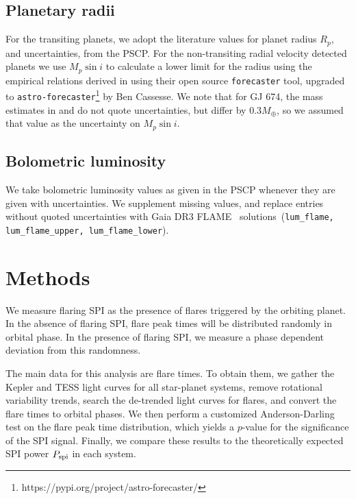 \documentclass[twocolumn]{aastex631}
\begin{document}
\subsection{Planetary radii}
\label{sec:data:planetradii}
For the transiting planets, we adopt the literature values for planet radius $R_p$, and uncertainties, from the PSCP. For the non-transiting radial velocity detected planets we use  $M_p\sin i$ to calculate a lower limit for the radius using the empirical relations derived in \cite{chen2017probabilistic} using their open source \texttt{forecaster} tool, upgraded to \texttt{astro-forecaster}\footnote{https://pypi.org/project/astro-forecaster/} by Ben Cassesse. We note that for GJ 674, the mass estimates in \cite{bonfils2007harps} and \cite{boisse2011disentangling} do not quote uncertainties, but differ by $0.3M_\oplus$, so we assumed that value as the uncertainty on $M_p\sin i$.

\subsection{Bolometric luminosity}
\label{sec:data:lum}

We take bolometric luminosity values as given in the PSCP whenever they are given with uncertainties. We supplement missing values, and replace entries without quoted uncertainties with Gaia DR3 FLAME~\citep{fouesneau2022gaia} solutions~(\texttt{lum\_flame, lum\_flame\_upper, lum\_flame\_lower}). 

\section{Methods}
\label{sec:methods}
We measure flaring SPI as the presence of flares triggered by the orbiting planet. In the absence of flaring SPI, flare peak times will be distributed randomly in orbital phase. In the presence of flaring SPI, we measure a phase dependent deviation from this randomness.

The main data for this analysis are flare times. To obtain them, we gather the Kepler and TESS light curves for all star-planet systems, remove rotational variability trends, search the de-trended light curves for flares, and convert the flare times to orbital phases. We then perform a customized Anderson-Darling test on the flare peak time distribution, which yields a $p$-value for the significance of the SPI signal. Finally, we compare these results to the theoretically expected SPI power $P_{\rm spi}$ in each system.
\end{document}
